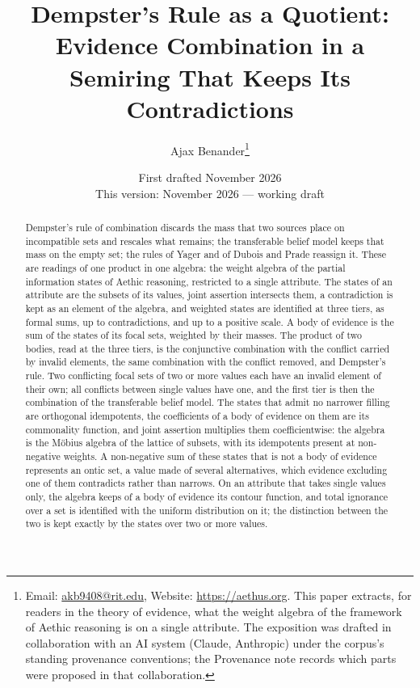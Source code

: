 \title{Dempster's Rule as a Quotient:\\ \large Evidence Combination in a Semiring That Keeps Its Contradictions}
\author{Ajax Benander\thanks{Email: \href{mailto:akb9408@rit.edu}{akb9408@rit.edu}, Website: \url{https://aethus.org}. This paper extracts, for readers in the theory of evidence, what the weight algebra of the framework of Aethic reasoning \cite{Aethus, AethusTree} is on a single attribute. The exposition was drafted in collaboration with an AI system (Claude, Anthropic) under the corpus's standing provenance conventions; the Provenance note records which parts were proposed in that collaboration.}}
\date{First drafted November 2026\\ {\small This version: November 2026 --- working draft}}


\maketitle

\begin{abstract}
\noindent Dempster's rule of combination discards the mass that two sources place on incompatible sets and rescales what remains; the transferable belief model keeps that mass on the empty set; the rules of Yager and of Dubois and Prade reassign it. These are readings of one product in one algebra: the weight algebra of the partial information states of Aethic reasoning, restricted to a single attribute. The states of an attribute are the subsets of its values, joint assertion intersects them, a contradiction is kept as an element of the algebra, and weighted states are identified at three tiers, as formal sums, up to contradictions, and up to a positive scale. A body of evidence is the sum of the states of its focal sets, weighted by their masses. The product of two bodies, read at the three tiers, is the conjunctive combination with the conflict carried by invalid elements, the same combination with the conflict removed, and Dempster's rule. Two conflicting focal sets of two or more values each have an invalid element of their own; all conflicts between single values have one, and the first tier is then the combination of the transferable belief model. The states that admit no narrower filling are orthogonal idempotents, the coefficients of a body of evidence on them are its commonality function, and joint assertion multiplies them coefficientwise: the algebra is the M\"obius algebra of the lattice of subsets, with its idempotents present at non-negative weights. A non-negative sum of these states that is not a body of evidence represents an ontic set, a value made of several alternatives, which evidence excluding one of them contradicts rather than narrows. On an attribute that takes single values only, the algebra keeps of a body of evidence its contour function, and total ignorance over a set is identified with the uniform distribution on it; the distinction between the two is kept exactly by the states over two or more values.
\end{abstract}

